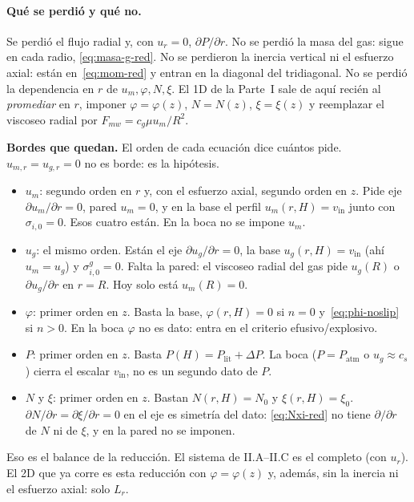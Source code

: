 \documentclass[11pt,a4paper]{article}
\newcommand{\p}{\partial}
\begin{document}
\paragraph{Qué se perdió y qué no.}
Se perdió el flujo radial y, con $u_r=0$, $\p P/\p r$.
No se perdió la masa del gas: sigue en cada radio,
\eqref{eq:masa-g-red}.
No se perdieron la inercia vertical ni el esfuerzo axial:
están en~\eqref{eq:mom-red} y entran en la diagonal del
tridiagonal. No se perdió la dependencia en $r$ de
$u_m,\varphi,N,\xi$. El 1D de la Parte~I sale de aquí
recién al \emph{promediar} en $r$, imponer
$\varphi=\varphi(z)$, $N=N(z)$, $\xi=\xi(z)$ y reemplazar
el viscoseo radial por $F_{mw}=c_g\mu u_m/R^2$.

\textbf{Bordes que quedan.}
El orden de cada ecuación dice cuántos pide.
$u_{m,r}=u_{g,r}=0$ no es borde: es la hipótesis.
\begin{itemize}
\item $u_m$: segundo orden en $r$ y, con el esfuerzo
  axial, segundo orden en $z$. Pide eje
  $\p u_m/\p r=0$, pared $u_m=0$, y en la base el perfil
  $u_m(r,H)=v_{\mathrm{in}}$ junto con $\sigma_{i,0}=0$.
  Esos cuatro están. En la boca no se impone $u_m$.
\item $u_g$: el mismo orden. Están el eje
  $\p u_g/\p r=0$, la base $u_g(r,H)=v_{\mathrm{in}}$
  (ahí $u_m=u_g$) y $\sigma^g_{i,0}=0$. Falta la pared:
  el viscoseo radial del gas pide $u_g(R)$ o
  $\p u_g/\p r$ en $r=R$. Hoy solo está $u_m(R)=0$.
\item $\varphi$: primer orden en $z$. Basta la base,
  $\varphi(r,H)=0$ si $n=0$ y~\eqref{eq:phi-noslip} si
  $n>0$. En la boca $\varphi$ no es dato: entra en el
  criterio efusivo/explosivo.
\item $P$: primer orden en $z$. Basta
  $P(H)=P_{\mathrm{lit}}+\Delta P$. La boca
  ($P=P_{\mathrm{atm}}$ o $u_g\approx c_s$) cierra el
  escalar $v_{\mathrm{in}}$, no es un segundo dato de $P$.
\item $N$ y $\xi$: primer orden en $z$. Bastan
  $N(r,H)=N_0$ y $\xi(r,H)=\xi_0$.
  $\p N/\p r=\p\xi/\p r=0$ en el eje es simetría del
  dato: \eqref{eq:Nxi-red} no tiene $\p/\p r$ de $N$ ni
  de $\xi$, y en la pared no se imponen.
\end{itemize}

Eso es el balance de la reducción. El sistema de
II.A--II.C es el completo (con $u_r$). El 2D que ya corre
es esta reducción con $\varphi=\varphi(z)$ y, además, sin
la inercia ni el esfuerzo axial: solo $L_r$.

\end{document}

